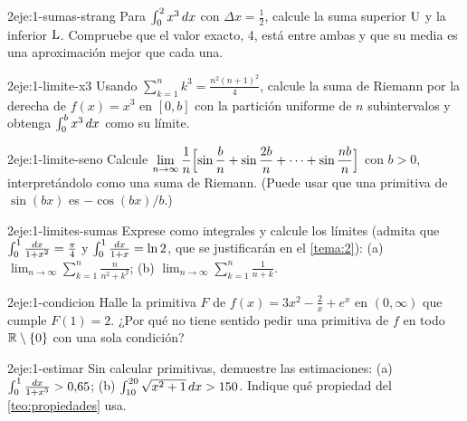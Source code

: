 \begin{ejercicio}{2}{eje:1-sumas-strang}
Para $\int_0^2x^{3}\mathop{}\!d x$ con $\Delta x=\frac12$, calcule la suma superior $\operatorname{U}$ y la inferior $\operatorname{L}$. Compruebe que el valor exacto, 4, está entre ambas y que su media es una aproximación mejor que cada una.
\end{ejercicio}

\begin{ejercicio}{2}{eje:1-limite-x3}
Usando $\sum_{k=1}^{n}k^{3}=\frac{n^{2}(n+1)^{2}}{4}$, calcule la suma de Riemann por la derecha de $f(x)=x^{3}$ en $[0,b]$ con la partición uniforme de $n$ subintervalos y obtenga $\int_0^b x^{3}\mathop{}\!d x$ como su límite.
\end{ejercicio}

\begin{ejercicio}{2}{eje:1-limite-seno}
Calcule $\displaystyle\lim_{n\to\infty}\frac1n\Bigl[\sin\frac bn+\sin\frac{2b}{n}+\dots+\sin\frac{nb}{n}\Bigr]$ con $b>0$, interpretándolo como una suma de Riemann. (Puede usar que una primitiva de $\sin(bx)$ es $-\cos(bx)/b$.)
\end{ejercicio}

\begin{ejercicio}{2}{eje:1-limites-sumas}
Exprese como integrales y calcule los límites (admita que $\int_0^1\frac{\mathop{}\!d x}{1+x^{2}}=\frac\pi4$ y $\int_0^1\frac{\mathop{}\!d x}{1+x}=\ln2$, que se justificarán en el \cref{tema:2}):
(a) $\displaystyle\lim_{n\to\infty}\sum_{k=1}^{n}\frac{n}{n^{2}+k^{2}}$; \quad (b) $\displaystyle\lim_{n\to\infty}\sum_{k=1}^{n}\frac{1}{n+k}$.
\end{ejercicio}

\begin{ejercicio}{2}{eje:1-condicion}
Halle la primitiva $F$ de $f(x)=3x^{2}-\frac2x+e^{x}$ en $(0,\infty)$ que cumple $F(1)=2$. ¿Por qué no tiene sentido pedir una primitiva de $f$ en todo $\mathbb{R}\setminus\{0\}$ con una sola condición?
\end{ejercicio}

\begin{ejercicio}{2}{eje:1-estimar}
Sin calcular primitivas, demuestre las estimaciones: (a) $\int_0^1\frac{\mathop{}\!d x}{1+x^{3}}>0{,}65$; (b) $\int_{10}^{20}\sqrt{x^{2}+1}\mathop{}\!d x>150$. Indique qué propiedad del \cref{teo:propiedades} usa.
\end{ejercicio}

